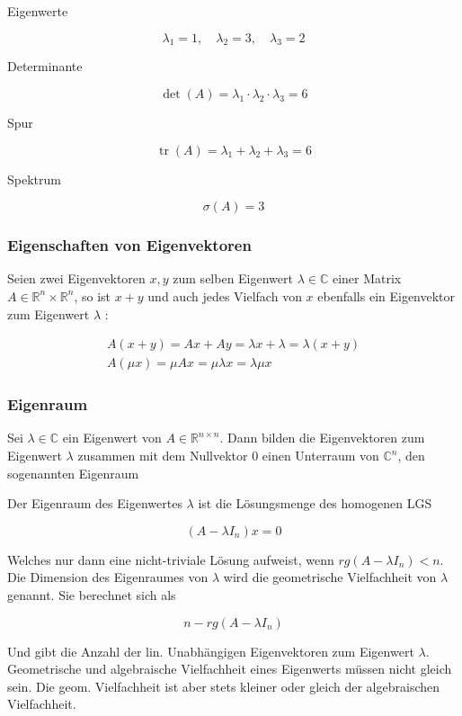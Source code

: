 Eigenwerte

$$
\lambda_{1}=1, \quad \lambda_{2}=3, \quad \lambda_{3}=2
$$

Determinante

$$
\operatorname{det}(A)=\lambda_{1} \cdot \lambda_{2} \cdot \lambda_{3}=6
$$

Spur

$$
\operatorname{tr}(A)=\lambda_{1}+\lambda_{2}+\lambda_{3}=6
$$

Spektrum

$$
\sigma(A)=3
$$

\subsubsection*{Eigenschaften von Eigenvektoren}
Seien zwei Eigenvektoren $x, y$ zum selben Eigenwert $\lambda \in \mathbb{C}$ einer Matrix $A \in \mathbb{R}^{n} \times \mathbb{R}^{n}$, so ist $x+y$ und auch jedes Vielfach von $x$ ebenfalls ein Eigenvektor zum Eigenwert $\lambda$ :

$$
\begin{gathered}
A(x+y)=A x+A y=\lambda x+\lambda=\lambda(x+y) \\
A(\mu x)=\mu A x=\mu \lambda x=\lambda \mu x
\end{gathered}
$$

\subsubsection*{Eigenraum}
Sei $\lambda \in \mathbb{C}$ ein Eigenwert von $A \in \mathbb{R}^{n \times n}$. Dann bilden die Eigenvektoren zum Eigenwert $\lambda$ zusammen mit dem Nullvektor 0 einen Unterraum von $\mathbb{C}^{n}$, den sogenannten Eigenraum

Der Eigenraum des Eigenwertes $\lambda$ ist die Lösungsmenge des homogenen LGS

$$
\left(A-\lambda I_{n}\right) x=0
$$

Welches nur dann eine nicht-triviale Lösung aufweist, wenn $r g\left(A-\lambda I_{n}\right)<n$.\\
Die Dimension des Eigenraumes von $\lambda$ wird die geometrische Vielfachheit von $\lambda$ genannt. Sie berechnet sich als

$$
n-r g\left(A-\lambda I_{n}\right)
$$

Und gibt die Anzahl der lin. Unabhängigen Eigenvektoren zum Eigenwert $\lambda$.\\
Geometrische und algebraische Vielfachheit eines Eigenwerts müssen nicht gleich sein. Die geom. Vielfachheit ist aber stets kleiner oder gleich der algebraischen Vielfachheit.

